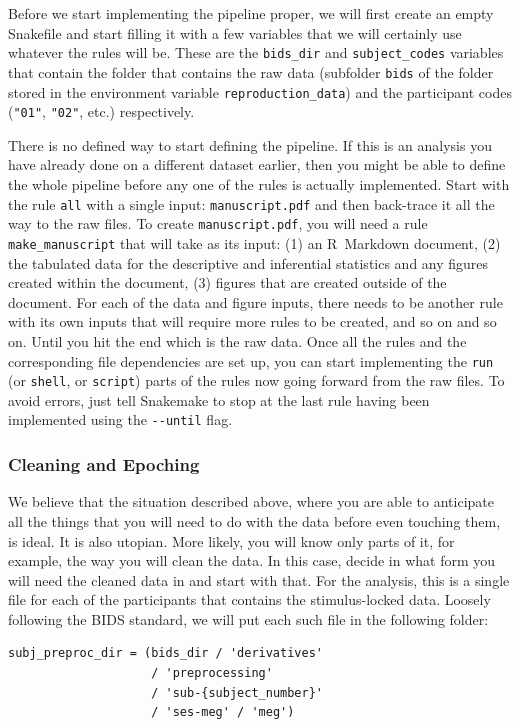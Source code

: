 \documentclass[a4paper,man,floatsintext,natbib]{apa6}
\begin{document}
Before we start implementing the pipeline proper, we will first create an empty Snakefile and start filling it with a few variables that we will certainly use whatever the rules will be. These are the \verb|bids_dir| and \verb|subject_codes| variables that contain the folder that contains the raw data (subfolder \verb|bids| of the folder stored in the environment variable \verb|reproduction_data|) and the participant codes (\verb|"01"|, \verb|"02"|, etc.) respectively.

There is no defined way to start defining the pipeline. If this is an analysis you have already done on a different dataset earlier, then you might be able to define the whole pipeline before any one of the rules is actually implemented. Start with the rule \verb|all| with a single input: \verb|manuscript.pdf| and then back-trace it all the way to the raw files. To create \verb|manuscript.pdf|, you will need a rule \verb|make_manuscript| that will take as its input: (1) an R~Markdown document, (2) the tabulated data for the descriptive and inferential statistics and any figures created within the document, (3) figures that are created outside of the document. For each of the data and figure inputs, there needs to be another rule with its own inputs that will require more rules to be created, and so on and so on. Until you hit the end which is the raw data. Once all the rules and the corresponding file dependencies are set up, you can start implementing the \verb|run| (or \verb|shell|, or \verb|script|) parts of the rules now going forward from the raw files. To avoid errors, just tell Snakemake to stop at the last rule having been implemented using the \verb|--until| flag.

\subsubsection{Cleaning and Epoching}
We believe that the situation described above, where you are able to anticipate all the things that you will need to do with the data before even touching them, is ideal. It is also utopian. More likely, you will know only parts of it, for example, the way you will clean the data. In this case, decide in what form you will need the cleaned data in and start with that. For the \cite{jasReproducibleMEGEEG2018a} analysis, this is a single file for each of the participants that contains the stimulus-locked data. Loosely following the BIDS standard, we will put each such file in the following folder:

\begin{verbatim}
subj_preproc_dir = (bids_dir / 'derivatives'  
                    / 'preprocessing' 
                    / 'sub-{subject_number}'
                    / 'ses-meg' / 'meg')
\end{verbatim}
\end{document}
